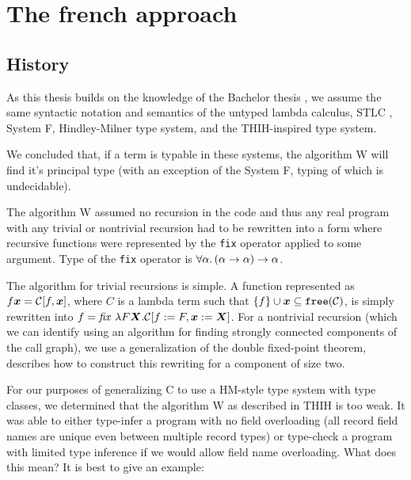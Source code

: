 \providecommand{\free}[1]{\mtt{free} (#1)}
\providecommand{\dom}[1]{\mtt{Dom} (#1)}
\providecommand{\ran}[1]{\mtt{Ran} (#1)}

\providecommand{\bmath}[1]{\boldsymbol{#1}}

\chapter{The french approach}
\label{chap1}


\section{History }

As this thesis builds on the knowledge of the Bachelor thesis , we assume the same syntactic notation and semantics of the untyped lambda calculus, STLC , System F, Hindley-Milner type system, and the THIH-inspired type system.

We concluded that, if a term is typable in these systems, the algorithm W will find it's principal type (with an exception of the System F, typing of which is undecidable).

The algorithm W assumed no recursion in the code and thus any real program with any trivial or nontrivial recursion had to be rewritten into a form where recursive functions were represented by the \lstinline{fix} operator applied to some argument. Type of the \lstinline{fix} operator is $\forall \alpha . \left(\alpha \to \alpha\right) \to \alpha$.

The algorithm for trivial recursions is simple. A function represented as $f \bmath{x} = \calC[f, \bmath{x}]$, where $C$ is a lambda term such that $\{f\} \cup \bmath{x} \subseteq \free \calC$, is simply rewritten into $f = \mathit{fix}\ \lambda F \bmath{X} .\calC[f := F, \bmath{x} := \bmath{X}]$. For a nontrivial recursion (which we can identify using an algorithm for finding strongly connected components of the call graph), we use a generalization of the double fixed-point  theorem, describes how to construct this rewriting for a component of size two.

For our purposes of generalizing C to use a HM-style type system with type classes, we determined that the algorithm W as described in THIH is too weak. It was able to either type-infer a program with no field overloading (all record field names are unique even between multiple record types) or type-check a program with limited type inference if we would allow field name overloading. What does this mean? It is best to give an example:

